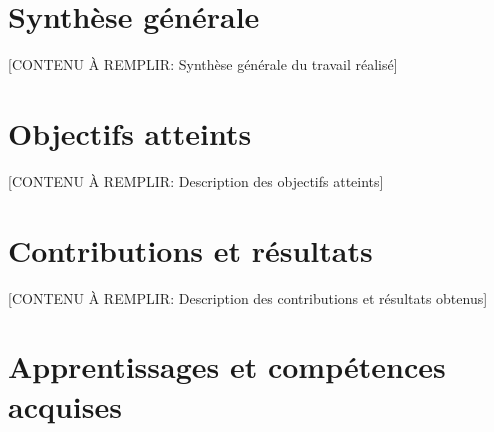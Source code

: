 

\section*{Synthèse générale}

[CONTENU À REMPLIR: Synthèse générale du travail réalisé]


\section*{Objectifs atteints}

[CONTENU À REMPLIR: Description des objectifs atteints]


\section*{Contributions et résultats}

[CONTENU À REMPLIR: Description des contributions et résultats obtenus]


\section*{Apprentissages et compétences acquises}


